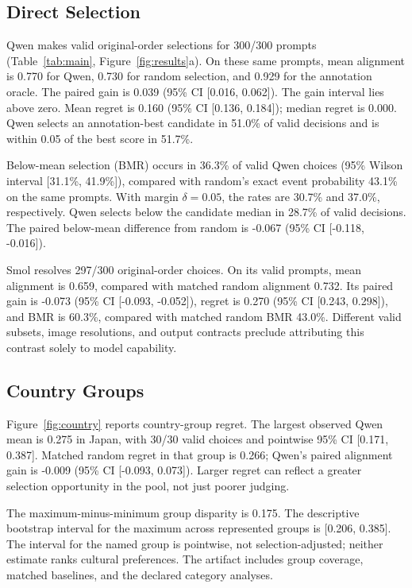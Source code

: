\subsection{Direct Selection}

Qwen makes valid original-order selections for 300/300 prompts (Table~\ref{tab:main}, Figure~\ref{fig:results}a). On these same prompts, mean alignment is 0.770 for Qwen, 0.730 for random selection, and 0.929 for the annotation oracle. The paired gain is 0.039 (95\% CI [0.016, 0.062]). The gain interval lies above zero. Mean regret is 0.160 (95\% CI [0.136, 0.184]); median regret is 0.000. Qwen selects an annotation-best candidate in 51.0\% of valid decisions and is within 0.05 of the best score in 51.7\%.

Below-mean selection (BMR) occurs in 36.3\% of valid Qwen choices (95\% Wilson interval [31.1\%, 41.9\%]), compared with random's exact event probability 43.1\% on the same prompts. With margin $\delta=0.05$, the rates are 30.7\% and 37.0\%, respectively. Qwen selects below the candidate median in 28.7\% of valid decisions. The paired below-mean difference from random is -0.067 (95\% CI [-0.118, -0.016]).

Smol resolves 297/300 original-order choices. On its valid prompts, mean alignment is 0.659, compared with matched random alignment 0.732. Its paired gain is -0.073 (95\% CI [-0.093, -0.052]), regret is 0.270 (95\% CI [0.243, 0.298]), and BMR is 60.3\%, compared with matched random BMR 43.0\%. Different valid subsets, image resolutions, and output contracts preclude attributing this contrast solely to model capability.

\subsection{Country Groups}

Figure~\ref{fig:country} reports country-group regret. The largest observed Qwen mean is 0.275 in Japan, with 30/30 valid choices and pointwise 95\% CI [0.171, 0.387]. Matched random regret in that group is 0.266; Qwen's paired alignment gain is -0.009 (95\% CI [-0.093, 0.073]). Larger regret can reflect a greater selection opportunity in the pool, not just poorer judging.

The maximum-minus-minimum group disparity is 0.175. The descriptive bootstrap interval for the maximum across represented groups is [0.206, 0.385]. The interval for the named group is pointwise, not selection-adjusted; neither estimate ranks cultural preferences. The artifact includes group coverage, matched baselines, and the declared category analyses.

